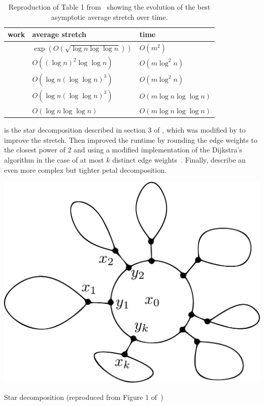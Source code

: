 \begin{table}[htbp]
  \centering
  \caption{Reproduction of Table 1 from~\autocite{Abraham2012} showing the evolution of the best
  asymptotic average stretch over time.}\label{tab:gtx_related}
  \begin{tabular}{lll}
    \toprule
    work                      & average stretch                          & time                    \\
    \midrule
    \autocite{LowerBound95}   & $\exp(O(\sqrt{\log n\log\log n}))$       & $O(m^2)$                \\
    \autocite{LowerStretch05} & $O((\log n)^2 \log \log n)$              & $O(m \log^2 n)$         \\
    \autocite{nearlyTight08}  & $O(\log n(\log \log n)^3)$              & $O(m \log^2 n)$         \\
    \autocite{TighterSDD11}   & $O(\log n(\log \log n)^3 )$              & $O(m \log n\log\log n)$ \\
    \autocite{Abraham2012}    & $O(\log n \log \log n)$                  & $O(m \log n\log\log n)$ \\
    \bottomrule
  \end{tabular}
\end{table}

\autocite{LowerStretch05} is the star decomposition described in section 3 of \autocite{papplow},
which was modified by \autocite{nearlyTight08} to improve the stretch. Then \textcite{TighterSDD11}
improved the runtime by rounding the edge weights to the closest power of $2$ and using a modified
implementation of the Dijkstra's algorithm in the case of at most $k$ distinct edge
weights~\autocite{FastPathFewWeights10}. Finally, \textcite{Abraham2012} describe an even more
complex but tighter petal decomposition.
\begin{marginfigure}
  \centering
  \includegraphics[width=.95\textwidth]{assets/raw/star_decomp.pdf}
  \caption{Star decomposition (reproduced from Figure 1 of~\autocite{LowerStretch05})}
  \label{fig:gtx_star_decomp}
\end{marginfigure}


